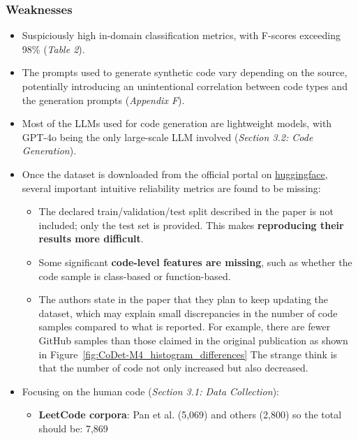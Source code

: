 \subsubsection*{Weaknesses}
\begin{itemize}
    \item Suspiciously high in-domain classification metrics, with F-scores exceeding 98\% {(\scriptsize\textit{Table 2})}.
    \item The prompts used to generate synthetic code vary depending on the source, potentially introducing an unintentional correlation between code types and the generation prompts {(\scriptsize\textit{Appendix F})}.
    \item Most of the LLMs used for code generation are lightweight models, with GPT-4o being the only large-scale LLM involved {(\scriptsize\textit{Section 3.2: Code Generation})}.
    \item Once the dataset is downloaded from the official portal on \href{https://huggingface.co/datasets/DaniilOr/CoDET-M4}{huggingface}, 
    several important intuitive reliability metrics are found to be missing:
    \begin{itemize}
        \item The declared train/validation/test split described in the paper is not 
        included; only the test set is provided. This makes 
        \textbf{reproducing their results more difficult}.
        \item Some significant \textbf{code-level features are missing}, 
        such as whether the code sample is class-based or function-based.
        \item The authors state in the paper that they plan to keep 
        updating the dataset, which may explain small discrepancies 
        in the number of code samples compared to what is reported. 
        For example, there are fewer GitHub samples than those 
        claimed in the original publication as shown 
        in Figure~\ref{fig:CoDet-M4_histogram_differences}
        The strange think is that the number of code not only 
        increased but 
        also decreased.
    \end{itemize}
    \item Focusing on the human code {(\scriptsize\textit{Section 3.1: Data Collection})}:
        \begin{itemize}
            \item \textbf{LeetCode corpora}: Pan et al. \cite{pan2024assessing} (5,069) and others (2,800) so the total should be: 7,869 

\end{itemize}
\end{itemize}
